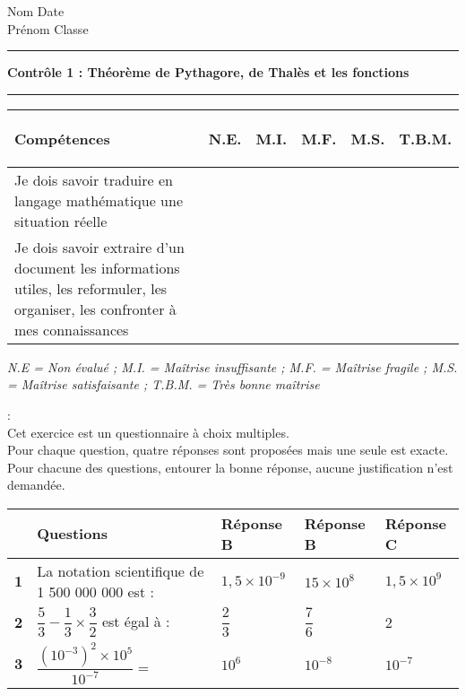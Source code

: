 \documentclass[a4paper,11pt]{article}
\newcounter{numexo}
\newcommand{\exo}[1]{\stepcounter{numexo}\noindent{\bf Exercice~\thenumexo} : \marginpar{\hfill /#1}}
\newcommand{\titre}[5] 
{
\noindent #2 \hfill #4 \\
#3 \hfill #5

\vspace{-1.6cm}

\begin{center}\rule{6cm}{0.5mm}\end{center}
\vspace{0.2cm}
\begin{center}{\large{\textbf{#1}}}\end{center}
\begin{center}\rule{6cm}{0.5mm}\end{center}
}
\begin{document}
\pagestyle{empty}
\titre{Contrôle 1 : Théorème de Pythagore, de Thalès et les fonctions }{Nom}{Prénom}{Date}{Classe}

\begin{flushleft}
\begin{tabular}{|m{9.5cm}|m{1.25cm}|m{1.25cm}|m{1.25cm}|m{1.25cm}|m{1.25cm}|}
\hline 
\textbf{Compétences} & \begin{center}
\textbf{N.E.}
\end{center} & \begin{center}
\textbf{M.I.}
\end{center} & \begin{center}
\textbf{M.F.}
\end{center}  & \begin{center}
\textbf{M.S.}
\end{center} & \begin{center}
\textbf{T.B.M.}
\end{center} \\ 
\hline 
Je dois savoir traduire en langage mathématique une situation réelle &  &  & & &\\
\hline 
Je dois savoir extraire d'un document les informations utiles, les reformuler, les organiser, les confronter à mes connaissances &  &  & & &\\
\hline
\end{tabular} 
\end{flushleft}

\textit{N.E = Non évalué ; M.I. = Maîtrise insuffisante ; M.F. = Maîtrise fragile ; M.S. = Maîtrise satisfaisante ; T.B.M. = Très bonne maîtrise}\\


\vspace*{0.25cm}

\exo{3} \\
Cet exercice est un questionnaire à choix multiples.\\
Pour chaque question, quatre réponses sont proposées mais une seule est exacte. Pour chacune des questions, entourer la bonne réponse, aucune justification n'est demandée.\\

\vspace*{0.25cm}

\renewcommand{\arraystretch}
{3.2}

\begin{tabular}{|c|p{9cm}|p{2.5cm}|p{2.35cm}|p{2.35cm}|}
\hline 
 & \textbf{Questions} & \textbf{Réponse B} & \textbf{Réponse B} & \textbf{Réponse C} \\ 
\hline 
\textbf{1} & La notation scientifique de 1 500 000 000 est : & $1,5 \times 10^{-9}$ & $15 \times 10^{8}$ & $1,5 \times 10^{9}$ \\
\hline 
\textbf{2} & $\dfrac{5}{3}-\dfrac{1}{3} \times \dfrac{3}{2}$ est égal à : & $\dfrac{2}{3}$ & $\dfrac{7}{6}$  & 2 \\ 
\hline 
\textbf{3 }& $\dfrac{(10^{-3})^{2} \times 10^{5}}{10^{-7}}=$ & $10^{6}$ & $10^{-8}$   & $10^{-7}$ \\ 
\hline 
\end{tabular} 
\end{document}
